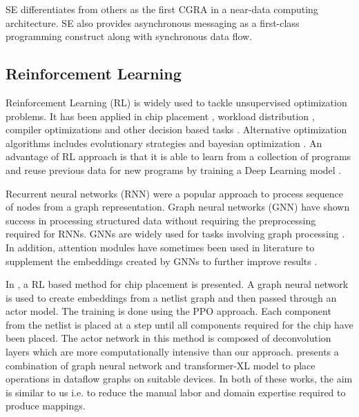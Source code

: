 SE differentiates from others as the first CGRA in a near-data computing architecture.
SE also provides asynchronous messaging as a first-class programming construct along with synchronous data flow. 


\subsection{Reinforcement Learning}
Reinforcement Learning (RL) is widely used to tackle unsupervised optimization problems.
It has been applied in chip placement \cite{mirhoseini2020chip}, workload distribution \cite{Mirhoseini_placementRNN, addanki2019placeto, zhou2019gdp}, compiler optimizations \cite{Zhou_compileGNN} and other decision based tasks \cite{kormushev2013reinforcement, ZophL16_NASRL}. 
Alternative optimization algorithms includes evolutionary strategies \cite{Zhichao_ESNAS} and bayesian optimization \cite{shi2020learned}. 
An advantage of RL approach is that it is able to learn from a collection of programs and reuse previous data for new programs by training a Deep Learning model \cite{zhou2019gdp}.

Recurrent neural networks (RNN) \cite{hochreiter1996lstm} were a popular approach to process sequence of nodes from a graph representation. 
Graph neural networks (GNN) \cite{gori2005new} have shown success in processing structured data without requiring the preprocessing required for RNNs.
GNNs are widely used for tasks involving graph processing \cite{Zhou_compileGNN, zhou2019gdp}. 
In addition, attention modules have sometimes been used in literature to supplement the embeddings created by GNNs to further improve results \cite{addanki2019placeto}.

In \cite{mirhoseini2020chip}, a RL based method for chip placement is presented.
A graph neural network is used to create embeddings from a netlist graph and then passed through an actor model.
The training is done using the PPO approach.
Each component from the netlist is placed at a step until all components required for the chip have been placed.
The actor network in this method is composed of deconvolution layers which are more computationally intensive than our approach. 
\cite{zhou2019gdp} presents a combination of graph neural network and transformer-XL model to place operations in dataflow graphs on suitable devices.
In both of these works, the aim is similar to us i.e. to reduce the manual labor and domain expertise required to produce mappings.

